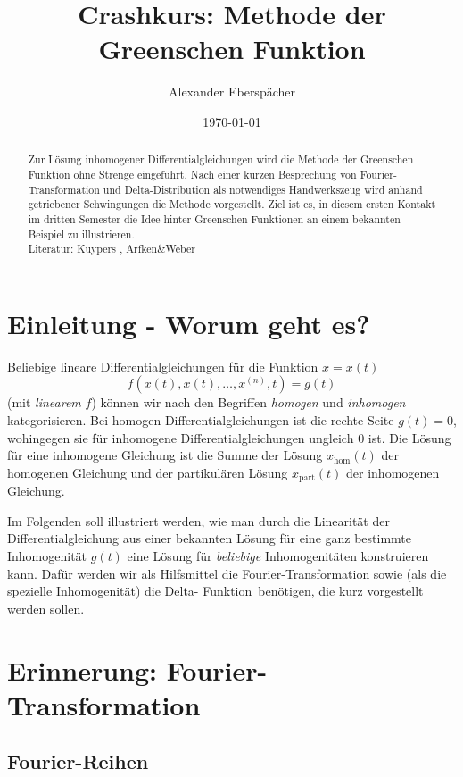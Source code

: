 \documentclass[paper=a4, fontsize=11.0pt, abstractoff, DIV12]{scrartcl}
\title{Crashkurs: Methode der Greenschen Funktion}
\author{Alexander Eberspächer}
\date{\today}
\newcommand{\xhom}{\ensuremath{x_\mathrm{hom}}}
\newcommand{\xinhom}{\ensuremath{x_\mathrm{part}}}
\begin{document}
 \maketitle \begin{abstract} Zur Lösung inhomogener
Differentialgleichungen wird die Methode der Greenschen Funktion ohne
Strenge eingeführt. Nach einer kurzen Besprechung von Fourier-Transformation
und Delta-Distribution als notwendiges Handwerkszeug wird anhand getriebener
Schwingungen die Methode vorgestellt. Ziel ist es, in diesem ersten Kontakt
im dritten Semester die Idee hinter Greenschen Funktionen an einem bekannten
Beispiel zu illustrieren.\\[0.5ex]
Literatur: Kuypers \cite{Kuypers}, Arfken\&Weber \cite{Arfken}
\end{abstract}


\section{Einleitung - Worum geht es?}

Beliebige lineare Differentialgleichungen für die Funktion $x = x(t)$
\begin{equation}
f\left(x(t), \dot{x}(t), \dots, x^{(n)}, t\right) = g(t)
\end{equation}
(mit \emph{linearem} $f$) können wir nach den Begriffen \emph{homogen} und
\emph{inhomogen} kategorisieren. Bei homogen Differentialgleichungen ist
die rechte Seite $g(t) = 0$, wohingegen sie für inhomogene
Differentialgleichungen ungleich $0$ ist. Die Lösung für eine inhomogene
Gleichung ist die Summe der Lösung $\xhom(t)$ der homogenen Gleichung und
der partikulären Lösung $\xinhom(t)$ der inhomogenen Gleichung.

Im Folgenden soll illustriert werden, wie man durch die Linearität der
Differentialgleichung aus einer bekannten Lösung für eine ganz bestimmte
Inhomogenität $g(t)$ eine Lösung für \emph{beliebige} Inhomogenitäten
konstruieren kann. Dafür werden wir als Hilfsmittel die
Fourier-Transformation sowie (als die spezielle Inhomogenität) die Delta-
\glqq Funktion\grqq~benötigen, die kurz vorgestellt werden sollen.

\section{Erinnerung: Fourier-Transformation}

\subsection{Fourier-Reihen}
\end{document}
